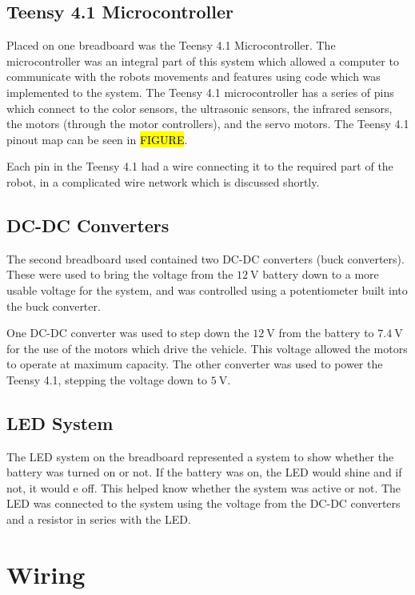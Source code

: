 \documentclass[11pt]{report}
\begin{document}
\subsection{Teensy 4.1 Microcontroller}
Placed on one breadboard was the Teensy 4.1 Microcontroller. The microcontroller was an integral part of this system which allowed a computer to communicate with the robots movements and features using code which was implemented to the system. The Teensy 4.1 microcontroller has a series of pins which connect to the color sensors, the ultrasonic sensors, the infrared sensors, the motors (through the motor controllers), and the servo motors. The Teensy 4.1 pinout map can be seen in \hl{FIGURE}. 
\par Each pin in the Teensy 4.1 had a wire connecting it to the required part of the robot, in a complicated wire network which is discussed shortly. 

\subsection{DC-DC Converters}
The second breadboard used contained two \gls{DC}-\gls{DC} converters (buck converters). These were used to bring the voltage from the $\SI{12}{\volt}$ battery down to a more usable voltage for the system, and was controlled using a potentiometer built into the buck converter. 
\par One DC-DC converter was used to step down the $\SI{12}{\volt}$ from the battery to $\SI{7.4}{\volt}$ for the use of the motors which drive the vehicle. This voltage allowed the motors to operate at maximum capacity. The other converter was used to power the Teensy 4.1, stepping the voltage down to $\SI{5}{\volt}$.

\subsection{LED System}
The \gls{LED} system on the breadboard represented a system to show whether the battery was turned on or not. If the battery was on, the \gls{LED} would shine and if not, it would e off. This helped know whether the system was active or not. The \gls{LED} was connected to the system using the voltage from the \gls{DC}-\gls{DC} converters and a resistor in series with the \gls{LED}.

\section{Wiring}\label{sec:wiring}
\end{document}
